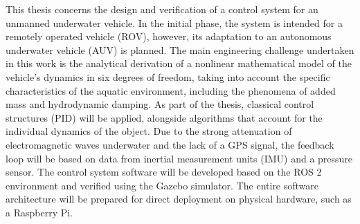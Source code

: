 This thesis concerns the design and verification of a control system for an unmanned underwater vehicle. In the initial phase, the system is intended for a remotely operated vehicle (ROV), however, its adaptation to an autonomous underwater vehicle (AUV) is planned. The main engineering challenge undertaken in this work is the analytical derivation of a nonlinear mathematical model of the vehicle's dynamics in six degrees of freedom, taking into account the specific characteristics of the aquatic environment, including the phenomena of added mass and hydrodynamic damping. As part of the thesis, classical control structures (PID) will be applied, alongside algorithms that account for the individual dynamics of the object. Due to the strong attenuation of electromagnetic waves underwater and the lack of a GPS signal, the feedback loop will be based on data from inertial measurement units (IMU) and a pressure sensor. The control system software will be developed based on the ROS 2 environment and verified using the Gazebo simulator. The entire software architecture will be prepared for direct deployment on physical hardware, such as a Raspberry Pi.